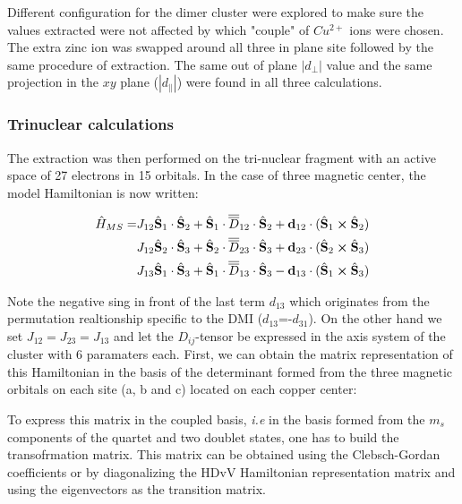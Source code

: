 \documentclass[10pt]{report}
\numberwithin{equation}{section}
\begin{document}
Different configuration for the dimer cluster were explored to make sure the values extracted were not affected by which "couple" of $Cu^{2+}$ ions were chosen. 
The extra zinc ion was swapped around all three in plane site followed by the same procedure of extraction. 
The same out of plane $|d_{\perp}|$ value and the same projection in the $xy$ plane ($|d_{\parallel}|$) were found in all three calculations.


\subsubsection*{Trinuclear calculations}

The extraction was then performed on the tri-nuclear fragment with an active space of 27 electrons in 15 orbitals.
In the case of three magnetic center, the model Hamiltonian is now written:


\begin{equation}
    \begin{split}
    \hat{H}_{MS}=&J_{12} \hat{\vb S}_1 \cdot \hat{\vb S}_2 + \hat{\vb S}_1 \cdot\overline{\overline{D}}_{12} \cdot \hat{\vb S}_2 + \vb{d}_{12} \cdot (\hat{\vb S}_1 \cross \hat{\vb S}_2)\\
    &J_{12} \hat{\vb S}_2 \cdot \hat{\vb S}_3 + \hat{\vb S}_2 \cdot\overline{\overline{D}}_{23} \cdot \hat{\vb S}_3 + \vb{d}_{23} \cdot (\hat{\vb S}_2 \cross \hat{\vb S}_3)\\
    &J_{13} \hat{\vb S}_1 \cdot \hat{\vb S}_3 + \hat{\vb S}_1 \cdot\overline{\overline{D}}_{13} \cdot \hat{\vb S}_3 - \vb{d}_{13} \cdot (\hat{\vb S}_1 \cross \hat{\vb S}_3)
    \end{split}
\end{equation}

Note the negative sing in front of the last term $d_{13}$ which originates from the permutation realtionship specific to the DMI ($d_{13}$=-$d_{31}$). On the other hand we set $J_{12}=J_{23}=J_{13}$ and let the $D_{ij}$-tensor be expressed in the axis system of the cluster with 6 paramaters each.
First, we can obtain the matrix representation of this Hamiltonian in the basis of the determinant formed from the three magnetic orbitals on each site (a, b and c) located on each copper center:


To express this matrix in the coupled basis, \textit{i.e} in the basis formed from the $m_s$ components of the quartet and two doublet states, one has to build the transofrmation matrix.
This matrix can be obtained using the Clebsch-Gordan coefficients or by diagonalizing the HDvV Hamiltonian representation matrix and using the eigenvectors as the transition matrix.
\end{document}
